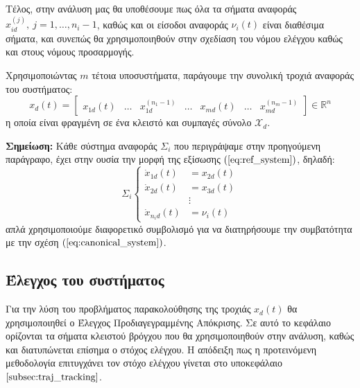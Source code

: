 Τέλος, στην ανάλυση μας θα υποθέσουμε πως όλα τα σήματα αναφοράς $x_{id}^{(j)},\: j = 1,\dots,n_i-1$, καθώς και οι είσοδοι αναφοράς $\nu_i(t)$ είναι διαθέσιμα σήματα, και συνεπώς θα χρησιμοποιηθούν στην σχεδίαση του νόμου ελέγχου καθώς και στους νόμους προσαρμογής.


Χρησιμοποιώντας $m$ τέτοια υποσυστήματα, παράγουμε την συνολική τροχιά αναφοράς του συστήματος:
\begin{equation}
x_d(t) = \begin{bmatrix}
x_{1d}(t) & \dots & x_{1d}^{(n_1-1)} & \dots & 
x_{md}(t) & \dots & x_{md}^{(n_m-1)}
\end{bmatrix} \in \mathbb{R}^n
\label{eq:x_desired}
\end{equation}
η οποία είναι φραγμένη σε ένα κλειστό και συμπαγές σύνολο $\mathcal{X}_d$.



\textbf{Σημείωση:} Κάθε σύστημα αναφοράς $\Sigma_i$ που περιγράψαμε στην προηγούμενη παράγραφο, έχει στην ουσία την μορφή της εξίσωσης $(\ref{eq:ref_system})$, δηλαδή:
\begin{equation*}
\Sigma_i
\begin{cases}
\dot{x}_{1d}(t) &= x_{2d}(t)  \\
\dot{x}_{2d}(t) &= x_{3d}(t) \\
                & \vdots \\
\dot{x}_{n_i d}(t) &= \nu_i(t)
\end{cases}
\label{eq:ref_subsystem}
\end{equation*}
απλά χρησιμοποιούμε διαφορετικό συμβολισμό για να διατηρήσουμε την συμβατότητα με την σχέση $(\ref{eq:canonical_system})$.


\subsection{Έλεγχος του συστήματος} %
Για την λύση του προβλήματος παρακολούθησης της τροχιάς $x_d(t)$ θα χρησιμοποιηθεί ο Έλεγχος Προδιαγεγραμμένης Απόκρισης. Σε αυτό το κεφάλαιο ορίζονται τα σήματα κλειστού βρόγχου που θα χρησιμοποιηθούν στην ανάλυση, καθώς και διατυπώνεται επίσημα ο στόχος ελέγχου. Η απόδειξη πως η προτεινόμενη μεθοδολογία επιτυγχάνει τον στόχο ελέγχου γίνεται στο υποκεφάλαιο $\ref{subsec:traj_tracking}$.

